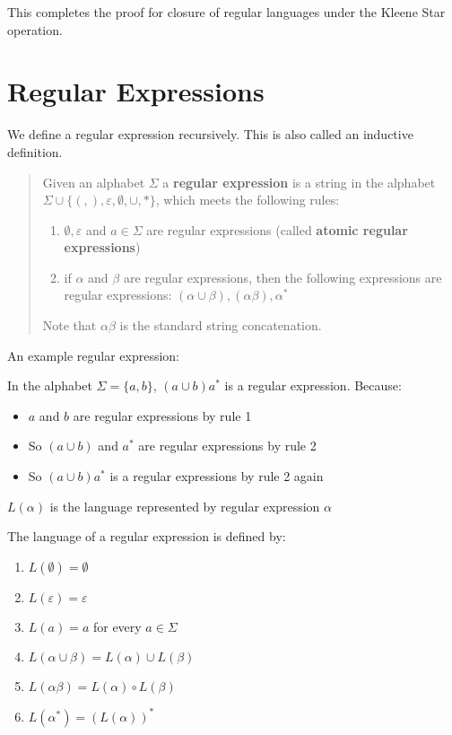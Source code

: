 \documentclass[11pt]{article}
\begin{document}
This completes the proof for closure of regular languages under the
Kleene Star operation.

\newpage
\section{Regular Expressions}
We define a regular expression recursively. This is also called an inductive
definition.

\begin{quote}
	Given an alphabet $\Sigma$ a \textbf{regular expression} is a string in the
	alphabet $\Sigma \cup \{(, ) , \varepsilon, \emptyset, \cup, \ast \}$, which
	meets the following rules:
	\begin{enumerate}
		\item $\emptyset, \varepsilon$ and $a \in \Sigma$ are regular expressions
		      (called \textbf{atomic regular expressions})
		\item if $\alpha$ and $\beta$ are regular expressions, then the following
		      expressions are regular expressions: $(\alpha \cup \beta), (\alpha\beta),
			      \alpha^\ast$
	\end{enumerate}
	Note that $\alpha\beta$ is the standard string concatenation.
\end{quote}

An example regular expression:

In the alphabet $\Sigma=\{a, b\}$, $(a \cup b) a^\ast$ is a regular expression.
Because:
\begin{itemize}
	\item[] $a$ and $b$ are regular expressions by rule 1
	\item[] So $(a \cup b)$ and $a^\ast$ are regular expressions by rule 2
	\item[] So $(a \cup b) a^\ast$ is a regular expressions by rule 2 again
\end{itemize}

$L(\alpha)$ is the language represented by regular expression $\alpha$

The language of a regular expression is defined by:
\begin{enumerate}
	\item $L(\emptyset) = \emptyset$
	\item $L(\varepsilon) = \varepsilon$
	\item $L(a) = a$ for every $a \in \Sigma$
	\item $L(\alpha \cup \beta) = L(\alpha) \cup L(\beta)$
	\item $L(\alpha\beta) = L(\alpha) \circ L(\beta)$
	\item $L(\alpha^\ast) = (L(\alpha))^\ast$
\end{enumerate}
\end{document}

